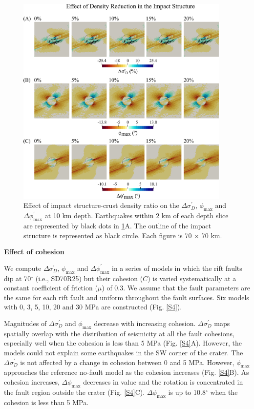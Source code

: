 \documentclass[draft,jgrga]{agutexSI2019}
\begin{document}
\begin{article}
\begin{figure}
\includegraphics[width=25pc]{Figures/effect_of_density.png}
\caption{Effect of impact structure-crust density ratio on the $\Delta\sigma_{D}^{\prime}$, $\phi_{\max}$ and $\Delta \phi_{\max}^{\prime}$ at 10 km depth. Earthquakes within 2 km of each depth slice are represented by black dots in \ref{S3}A. The outline of the impact structure is represented as black circle. Each figure is 70 $\times$ 70 km.}
\label{S3}
\end{figure}

\vspace{10mm} %

\noindent\textbf{Effect of cohesion}

We compute $\Delta \sigma_{D}^{\prime}$, $\phi_{\max}$ and $\Delta \phi_{\max}^{\prime}$ in a series of models in which the rift faults dip at 70$^{\circ}$ (i.e., SD70R25) but their cohesion ($C$) is varied systematically at a constant coefficient of friction ($\mu$) of 0.3. We assume that the fault parameters are the same for each rift fault and uniform throughout the fault surfaces. Six models with 0, 3, 5, 10, 20 and 30 MPa are constructed (Fig. \ref{S4}).

Magnitudes of $\Delta\sigma_D^{\prime}$ and $\phi_{\max}$ decrease with increasing cohesion. $\Delta\sigma_D^{\prime}$ maps spatially overlap with the distribution of seismicity at all the fault cohesions, especially well when the cohesion is less than 5 MPa (Fig. \ref{S4}A). However, the models could not explain some earthquakes in the SW corner of the crater. The $\Delta\sigma_D^{\prime}$ is not affected by a change in cohesion between 0 and 5 MPa. However, $\phi_{\max}$ approaches the reference no-fault model as the cohesion increases (Fig. \ref{S4}B). As cohesion increases, $\Delta\phi_{\max}$ decreases in value and the rotation is concentrated in the fault region outside the crater (Fig. \ref{S4}C). $\Delta\phi_{\max}$ is up to 10.8$^\circ$ when the cohesion is less than 5 MPa. 


\end{article}
\end{document}

